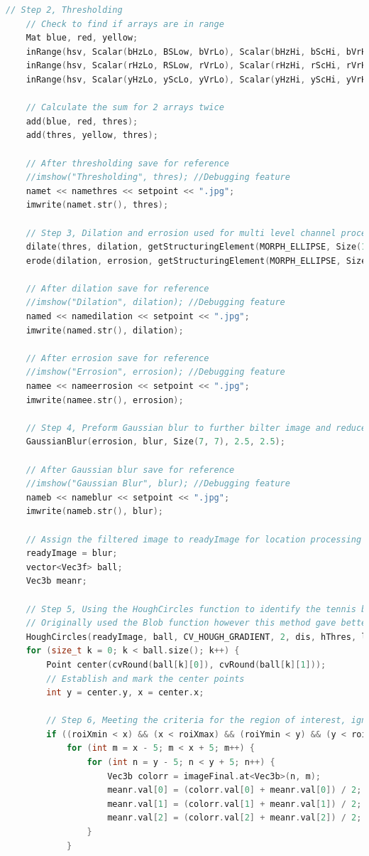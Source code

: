 \documentclass[a4paper, 10pt]{article}
\begin{document}
\begin{lstlisting}[language = C++]
	// Step 2, Thresholding 
	// Check to find if arrays are in range
	Mat blue, red, yellow;
	inRange(hsv, Scalar(bHzLo, BSLow, bVrLo), Scalar(bHzHi, bScHi, bVrHi), blue);
	inRange(hsv, Scalar(rHzLo, RSLow, rVrLo), Scalar(rHzHi, rScHi, rVrHi), red);
	inRange(hsv, Scalar(yHzLo, yScLo, yVrLo), Scalar(yHzHi, yScHi, yVrHi), yellow);
	
	// Calculate the sum for 2 arrays twice 
	add(blue, red, thres);
	add(thres, yellow, thres);

	// After thresholding save for reference
	//imshow("Thresholding", thres); //Debugging feature
	namet << namethres << setpoint << ".jpg";
	imwrite(namet.str(), thres);

	// Step 3, Dilation and errosion used for multi level channel processing 
	dilate(thres, dilation, getStructuringElement(MORPH_ELLIPSE, Size(11, 11)));
	erode(dilation, errosion, getStructuringElement(MORPH_ELLIPSE, Size(3, 3)));

	// After dilation save for reference
	//imshow("Dilation", dilation); //Debugging feature
	named << namedilation << setpoint << ".jpg";
	imwrite(named.str(), dilation);

	// After errosion save for reference
	//imshow("Errosion", errosion); //Debugging feature
	namee << nameerrosion << setpoint << ".jpg";
	imwrite(namee.str(), errosion);

	// Step 4, Preform Gaussian blur to further bilter image and reduce noise to better detect the raound point for the circles
	GaussianBlur(errosion, blur, Size(7, 7), 2.5, 2.5);

	// After Gaussian blur save for reference
	//imshow("Gaussian Blur", blur); //Debugging feature
	nameb << nameblur << setpoint << ".jpg";
	imwrite(nameb.str(), blur);

	// Assign the filtered image to readyImage for location processing
	readyImage = blur;
	vector<Vec3f> ball;
	Vec3b meanr;

	// Step 5, Using the HoughCircles function to identify the tennis ball radius
	// Originally used the Blob function however this method gave better results
	HoughCircles(readyImage, ball, CV_HOUGH_GRADIENT, 2, dis, hThres, lThres, minRad, maxRad);
	for (size_t k = 0; k < ball.size(); k++) {
		Point center(cvRound(ball[k][0]), cvRound(ball[k][1]));
		// Establish and mark the center points
		int y = center.y, x = center.x;

		// Step 6, Meeting the criteria for the region of interest, ignore rest
		if ((roiXmin < x) && (x < roiXmax) && (roiYmin < y) && (y < roiYmax)) {
			for (int m = x - 5; m < x + 5; m++) {
				for (int n = y - 5; n < y + 5; n++) {
					Vec3b colorr = imageFinal.at<Vec3b>(n, m);
					meanr.val[0] = (colorr.val[0] + meanr.val[0]) / 2;
					meanr.val[1] = (colorr.val[1] + meanr.val[1]) / 2;
					meanr.val[2] = (colorr.val[2] + meanr.val[2]) / 2;
				}
			}


\end{lstlisting}
\end{document}
